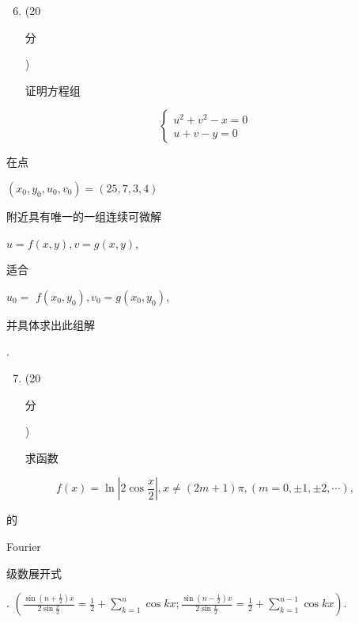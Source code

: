 \documentclass[10pt]{article}
\begin{document}
\begin{enumerate}
  \setcounter{enumi}{5}
  \item (20 \begin{CJK}{UTF8}{mj}分\end{CJK}) \begin{CJK}{UTF8}{mj}证明方程组\end{CJK}
\end{enumerate}
$$
\left\{\begin{array}{l}
u^{2}+v^{2}-x=0 \\
u+v-y=0
\end{array}\right.
$$
\begin{CJK}{UTF8}{mj}在点\end{CJK} $\left(x_{0}, y_{0}, u_{0}, v_{0}\right)=(25,7,3,4)$ \begin{CJK}{UTF8}{mj}附近具有唯一的一组连续可微解\end{CJK} $u=f(x, y), v=g(x, y)$, \begin{CJK}{UTF8}{mj}适合\end{CJK} $u_{0}=$ $f\left(x_{0}, y_{0}\right), v_{0}=g\left(x_{0}, y_{0}\right)$, \begin{CJK}{UTF8}{mj}并具体求出此组解\end{CJK}.

\begin{enumerate}
  \setcounter{enumi}{6}
  \item (20 \begin{CJK}{UTF8}{mj}分\end{CJK}) \begin{CJK}{UTF8}{mj}求函数\end{CJK}
\end{enumerate}
$$
f(x)=\ln \left|2 \cos \frac{x}{2}\right|, x \neq(2 m+1) \pi,(m=0, \pm 1, \pm 2, \cdots),
$$
\begin{CJK}{UTF8}{mj}的\end{CJK} Fourier \begin{CJK}{UTF8}{mj}级数展开式\end{CJK}. $\left(\frac{\sin \left(n+\frac{1}{2}\right) x}{2 \sin \frac{x}{2}}=\frac{1}{2}+\sum_{k=1}^{n} \cos k x ; \frac{\sin \left(n-\frac{1}{2}\right) x}{2 \sin \frac{x}{2}}=\frac{1}{2}+\sum_{k=1}^{n-1} \cos k x\right)$.
\end{document}
